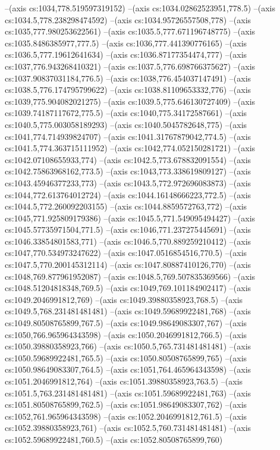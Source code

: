 --(axis cs:1034,778.519597319152)
--(axis cs:1034.02862523951,778.5)
--(axis cs:1034.5,778.238298474592)
--(axis cs:1034.95726557508,778)
--(axis cs:1035,777.980253622561)
--(axis cs:1035.5,777.671196748775)
--(axis cs:1035.8486385977,777.5)
--(axis cs:1036,777.441390776165)
--(axis cs:1036.5,777.19612641634)
--(axis cs:1036.87177354474,777)
--(axis cs:1037,776.943268410321)
--(axis cs:1037.5,776.698766375627)
--(axis cs:1037.90837031184,776.5)
--(axis cs:1038,776.454037147491)
--(axis cs:1038.5,776.174795799622)
--(axis cs:1038.81109653332,776)
--(axis cs:1039,775.904082021275)
--(axis cs:1039.5,775.646130727409)
--(axis cs:1039.74187117672,775.5)
--(axis cs:1040,775.34172587661)
--(axis cs:1040.5,775.003058189293)
--(axis cs:1040.5045782648,775)
--(axis cs:1041,774.714939824707)
--(axis cs:1041.31767879042,774.5)
--(axis cs:1041.5,774.363715111952)
--(axis cs:1042,774.052150281721)
--(axis cs:1042.07108655933,774)
--(axis cs:1042.5,773.678832091554)
--(axis cs:1042.75863968162,773.5)
--(axis cs:1043,773.338619809127)
--(axis cs:1043.45946377233,773)
--(axis cs:1043.5,772.972696083873)
--(axis cs:1044,772.613764012724)
--(axis cs:1044.16148666223,772.5)
--(axis cs:1044.5,772.260092203155)
--(axis cs:1044.8859572763,772)
--(axis cs:1045,771.925809179386)
--(axis cs:1045.5,771.549095494427)
--(axis cs:1045.57735971504,771.5)
--(axis cs:1046,771.237275445691)
--(axis cs:1046.33854801583,771)
--(axis cs:1046.5,770.889259210412)
--(axis cs:1047,770.534973247622)
--(axis cs:1047.0516854516,770.5)
--(axis cs:1047.5,770.200145312114)
--(axis cs:1047.80887410126,770)
--(axis cs:1048,769.877961952087)
--(axis cs:1048.5,769.507835369566)
--(axis cs:1048.51204818348,769.5)
--(axis cs:1049,769.101184902417)
--(axis cs:1049.2046991812,769)
--(axis cs:1049.39880358923,768.5)
--(axis cs:1049.5,768.231481481481)
--(axis cs:1049.59689922481,768)
--(axis cs:1049.80508765899,767.5)
--(axis cs:1049.98649083307,767)
--(axis cs:1050,766.965964343598)
--(axis cs:1050.2046991812,766.5)
--(axis cs:1050.39880358923,766)
--(axis cs:1050.5,765.731481481481)
--(axis cs:1050.59689922481,765.5)
--(axis cs:1050.80508765899,765)
--(axis cs:1050.98649083307,764.5)
--(axis cs:1051,764.465964343598)
--(axis cs:1051.2046991812,764)
--(axis cs:1051.39880358923,763.5)
--(axis cs:1051.5,763.231481481481)
--(axis cs:1051.59689922481,763)
--(axis cs:1051.80508765899,762.5)
--(axis cs:1051.98649083307,762)
--(axis cs:1052,761.965964343598)
--(axis cs:1052.2046991812,761.5)
--(axis cs:1052.39880358923,761)
--(axis cs:1052.5,760.731481481481)
--(axis cs:1052.59689922481,760.5)
--(axis cs:1052.80508765899,760)

